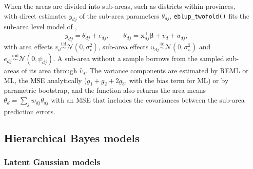 When the areas are divided into sub-areas, such as districts within provinces, with direct estimates \(y_{dj}\) of the sub-area parameters \(\theta_{dj}\), \texttt{eblup\_twofold()} fits the sub-area level model of \citet{torabi2014small},
\begin{equation}
y_{dj} = \theta_{dj} + e_{dj}, \qquad \theta_{dj} = \boldsymbol{x}_{dj}^\top\boldsymbol{\beta} + v_d + u_{dj},
\label{eq:twofold}
\end{equation}
with area effects \(v_d \overset{\mathrm{iid}}{\sim} \mathcal{N}(0, \sigma_v^2)\), sub-area effects \(u_{dj} \overset{\mathrm{iid}}{\sim} \mathcal{N}(0, \sigma_u^2)\) and \(e_{dj} \overset{\mathrm{ind}}{\sim} \mathcal{N}(0, \psi_{dj})\). A sub-area without a sample borrows from the sampled sub-areas of its area through \(\hat{v}_d\). The variance components are estimated by REML or ML, the MSE analytically (\(g_1 + g_2 + 2g_3\), with the bias term for ML) or by parametric bootstrap, and the function also returns the area means \(\theta_d = \sum_j w_{dj}\theta_{dj}\) with an MSE that includes the covariances between the sub-area prediction errors.

\subsection{Hierarchical Bayes models}\label{sec:methods-hb}

\subsubsection{Latent Gaussian models}\label{latent-gaussian-models}

